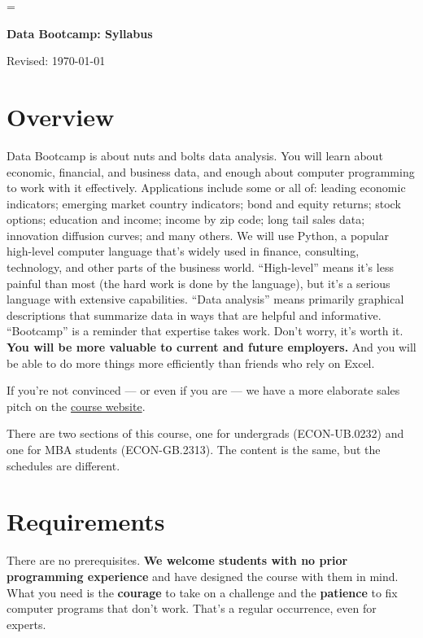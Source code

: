 \documentclass[11pt]{article}
\begin{document}
\parskip=\bigskipamount
\parindent=0.0in
\thispagestyle{empty}


\bigskip\bigskip
\centerline{\Large \bf Data Bootcamp:  Syllabus}
\centerline{Revised: \today}


\section*{Overview}

Data Bootcamp is about nuts and bolts data analysis. You will learn about economic, financial, and business
data, and enough about computer programming to work with it effectively.
Applications include some or all of: leading economic indicators; emerging market country indicators;
bond and equity returns; stock options; education and income; income by zip code; long tail sales data; innovation diffusion curves; and many others.
We will use Python, a popular high-level computer language that's widely used in finance, consulting,
technology, and other parts of the business world.
``High-level'' means it's less painful than most (the hard work is done by the language),
but it's a serious language with extensive capabilities.
``Data analysis'' means primarily graphical descriptions that summarize data
in ways that are helpful and informative.
``Bootcamp'' is a reminder that expertise takes work. Don't worry, it's worth it.
{\bf You will be more valuable to current and future employers.\/}
And you will be able to do more things more efficiently than
friends who rely on Excel.

If you're not convinced --- or even if you are ---
we have a more elaborate sales pitch on the
\href{http://databootcamp.nyuecon.com/}{course website}.

There are two sections of this course,
one for undergrads (ECON-UB.0232) and one for MBA students (ECON-GB.2313).
The content is the same, but the schedules are different.


\section*{Requirements}

There are no prerequisites.
{\bf We welcome students with no prior programming experience\/}
and have designed the course with them in mind.
What you need is the {\bf courage\/} to take on a challenge
and the {\bf patience\/} to fix computer programs that don't work.
That's a regular occurrence, even for experts.
\end{document}
